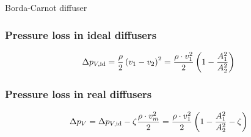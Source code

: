 \documentclass{article}
\begin{document}
\begin{multicols}{2}
\begin{examplebox}{Borda-Carnot diffuser}
    \subsubsection{Pressure loss in ideal diffusers}
    \begin{equation}
        \Delta p_{V,\rm id} = \frac{\rho}{2}\left(v_1 - v_2\right)^2 = \frac{\rho\cdot v_1^2}{2}\left(1-\frac{A_1^2}{A_2^2}\right)
    \end{equation}

    \subsubsection{Pressure loss in real diffusers}
    \begin{equation}
        \Delta p_V = \Delta p_{V,\rm id} - \zeta\frac{\rho \cdot v_m^2}{2} = \frac{\rho\cdot v_1^2}{2}\left(1-\frac{A_1^2}{A_2^2}-\zeta\right)
    \end{equation}
\end{examplebox}
\vfill
\end{multicols}
\end{document}
